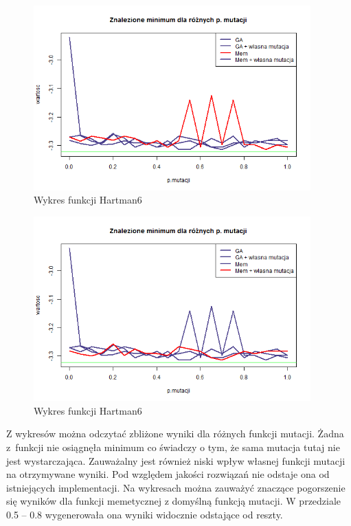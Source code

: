 \documentclass[11pt, a4paper]{article}
\newcommand{\fbi}{\leavevmode{\parindent=1em\indent}}
\begin{document}
\begin{figure}[H]
	\centering
	\includegraphics[width=0.95\textwidth]{./assets/Hartman6mut3.png}
	\caption{Wykres funkcji Hartman6}
	\label{fig:Hartman6mut3}
\end{figure}

\begin{figure}[H]
	\centering
	\includegraphics[width=0.95\textwidth]{./assets/Hartman6mut4.png}
	\caption{Wykres funkcji Hartman6}
	\label{fig:Hartman6mut4}
\end{figure}

\fbi
Z wykresów można odczytać zbliżone wyniki dla różnych funkcji mutacji. Żadna z~funkcji nie osiągnęła minimum co świadczy o tym, że sama mutacja tutaj nie jest wystarczająca. Zauważalny jest również niski wpływ własnej funkcji mutacji na otrzymywane wyniki. Pod względem jakości rozwiązań nie odstaje ona od istniejących implementacji. Na wykresach można zauważyć znaczące pogorszenie się wyników dla funkcji memetycznej z domyślną funkcją mutacji. W przedziale 0.5 -- 0.8 wygenerowała ona wyniki widocznie odstające od reszty.
\end{document}
